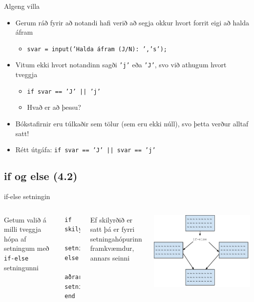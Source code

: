 \documentclass{beamer}
\begin{document}
\begin{frame}{Algeng villa}
\begin{itemize}
 \item Gerum ráð fyrir að notandi hafi verið að segja okkur hvort forrit eigi að halda áfram
 \begin{itemize}
  \item \texttt{svar = input('Halda áfram (J/N): ','s');}
 \end{itemize}
 \item Vitum ekki hvort notandinn sagði \texttt{'j'} eða \texttt{'J'}, svo við athugum hvort tveggja
 \begin{itemize}
  \item \texttt{if svar == 'J' || 'j'}
  \item Hvað er að þessu? \pause
 \end{itemize}
 \item Bókstafirnir eru túlkaðir sem tölur (sem eru ekki núll), svo þetta verður alltaf satt!
 \item Rétt útgáfa: \texttt{if svar == 'J' || svar == 'j'}
\end{itemize}
\end{frame}

\subsection{if og else (4.2)}

\begin{frame}[fragile]{if-else setningin}
\begin{columns}
Getum valið á milli tveggja hópa af setningum með \texttt{if-else} setningunni
\begin{verbatim}
if skilyrði
    setningar
else
    aðrar setningar
end
\end{verbatim}
Ef skilyrðið er satt þá er fyrri setningahópurinn framkvæmdur, annars seinni
\begin{center}
 \includegraphics[width=\linewidth]{../Pics/if-else}
\end{center}
\end{columns}
\end{frame}
\end{document}
